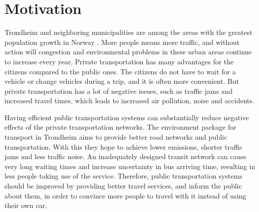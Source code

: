\section{Motivation} 

Trondheim and neighboring municipalities are among the areas with the greatest population growth in Norway \citep{website:miljopakken}. More people means more traffic, and without action will congestion and environmental problems in these urban areas continue to increase every year. 
Private transportation has many advantages for the citizens compared to the public ones. The citizens do not have to wait for a vehicle or change vehicles during a trip, and it is often more convenient. But private transportation has a lot of negative issues, such as traffic jams and increased travel times, which leads to increased air pollution, noise and accidents. 

Having efficient public transportation systems can substantially reduce negative effects of the private transportation networks. The environment package \citep{website:miljopakken} for transport in Trondheim aims to provide better road networks and public transportation. With this they hope to achieve lower emissions, shorter traffic jams and less traffic noise. An inadequately designed transit network can cause very long waiting times and increase uncertainty in bus arriving time, resulting in less people taking use of the service. Therefore, public transportation systems should be improved by providing better travel services, and inform the public about them, in order to convince more people to travel with it instead of using their own car. 

